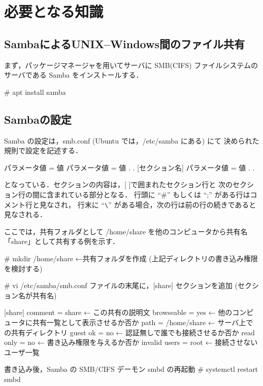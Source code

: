 \section{必要となる知識}

\subsection{SambaによるUNIX--Windows間のファイル共有}
\setcounter{subsubsection}{0}

まず，パッケージマネージャを用いてサーバに SMB(CIFS) ファイルシステムの
サーバである Samba をインストールする．

\begin{cli}
# apt install samba
\end{cli}

\subsection*{Sambaの設定}
Samba の設定は，smb.conf (Ubuntu では，/etc/samba にある) にて
決められた規則で設定を記述する．

\begin{cli}
[セクション名]
パラメータ値 = 値
パラメータ値 = 値
.
.
[セクション名]  
パラメータ値 = 値
.
.
\end{cli}

となっている．セクションの内容は，[ ]で囲まれたセクション行と
次のセクション行の間に含まれている部分となる．
行頭に ``\#'' もしくは ``;'' がある行はコメント行と見なされ，
行末に ``\verb+\+'' がある場合，次の行は前の行の続きであると見なされる．

ここでは，共有フォルダとして /home/share を他のコンピュータから共有名
「share」として共有する例を示す．

\begin{cli}
# mkdir /home/share   ←共有フォルダを作成
  (上記ディレクトリの書き込み権限を検討する)

# vi /etc/samba/smb.conf
ファイルの末尾に，[share] セクションを追加
(セクション名が共有名)

[share]
   comment = share  ← この共有の説明文
   browseable = yes  ← 他のコンピュータに共有一覧として表示させるか否か
   path = /home/share ← サーバ上での共有ディレクトリ
   guest ok = no  ← 認証無しで誰でも接続させるか否か
   read only = no ← 書き込み権限を与えるか否か
   invalid users = root ← 接続させないユーザ一覧

書き込み後，Samba の SMB/CIFS デーモン smbd の再起動
# systemctl restart smbd
\end{cli}

